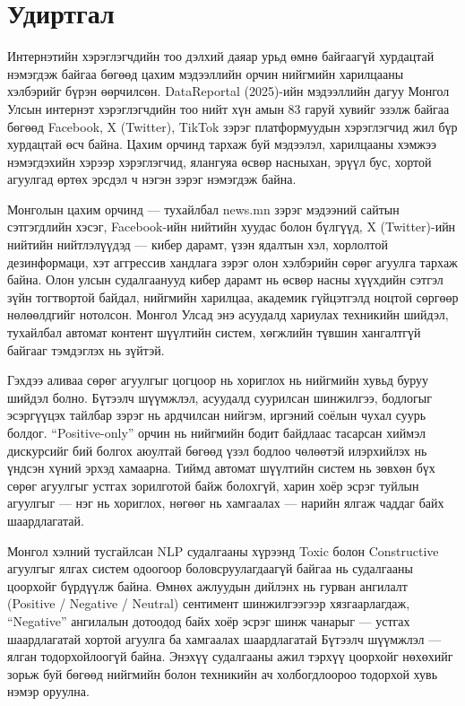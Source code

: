 
{}

\section*{Удиртгал}

Интернэтийн хэрэглэгчдийн тоо дэлхий даяар урьд өмнө байгаагүй хурдацтай
нэмэгдэж байгаа бөгөөд цахим мэдээллийн орчин нийгмийн харилцааны хэлбэрийг
бүрэн өөрчилсөн. DataReportal (2025)-ийн мэдээллийн дагуу Монгол Улсын
интернэт хэрэглэгчдийн тоо нийт хүн амын 83 гаруй хувийг эзэлж байгаа бөгөөд
Facebook, X (Twitter), TikTok зэрэг платформуудын хэрэглэгчид жил бүр хурдацтай
өсч байна. Цахим орчинд тархаж буй мэдээлэл, харилцааны хэмжээ нэмэгдэхийн
хэрээр хэрэглэгчид, ялангуяа өсвөр насныхан, эрүүл бус, хортой агуулгад
өртөх эрсдэл ч нэгэн зэрэг нэмэгдэж байна.

Монголын цахим орчинд --- тухайлбал news.mn зэрэг мэдээний сайтын сэтгэгдлийн
хэсэг, Facebook-ийн нийтийн хуудас болон бүлгүүд, X (Twitter)-ийн нийтийн
нийтлэлүүдэд --- кибер дарамт, үзэн ядалтын хэл, хорлолтой дезинформаци, хэт
аггрессив хандлага зэрэг олон хэлбэрийн сөрөг агуулга тархаж байна. Олон
улсын судалгаанууд \cite{kowalski2014,vogels2022} кибер дарамт нь өсвөр насны
хүүхдийн сэтгэл зүйн тогтвортой байдал, нийгмийн харилцаа, академик
гүйцэтгэлд ноцтой сөргөөр нөлөөлдгийг нотолсон. Монгол Улсад энэ асуудалд
хариулах техникийн шийдэл, тухайлбал автомат контент шүүлтийн систем,
хөгжлийн түвшин хангалтгүй байгааг тэмдэглэх нь зүйтэй.

Гэхдээ аливаа сөрөг агуулгыг цогцоор нь хориглох нь нийгмийн хувьд буруу
шийдэл болно. Бүтээлч шүүмжлэл, асуудалд суурилсан шинжилгээ, бодлогыг
эсэргүүцэх тайлбар зэрэг нь ардчилсан нийгэм, иргэний соёлын чухал суурь
болдог. ``Positive-only'' орчин нь нийгмийн бодит байдлаас тасарсан хиймэл
дискурсийг бий болгох аюултай бөгөөд үзэл бодлоо чөлөөтэй илэрхийлэх нь
үндсэн хүний эрхэд хамаарна. Тиймд автомат шүүлтийн систем нь зөвхөн бүх
сөрөг агуулгыг устгах зорилготой байж болохгүй, харин хоёр эсрэг туйлын
агуулгыг --- нэг нь хориглох, нөгөөг нь хамгаалах --- нарийн ялгаж чаддаг
байх шаардлагатай.

Монгол хэлний тусгайлсан NLP судалгааны хүрээнд Toxic болон Constructive
агуулгыг ялгах систем одоогоор боловсруулагдаагүй байгаа нь судалгааны
цоорхойг бүрдүүлж байна. Өмнөх ажлуудын дийлэнх нь гурван ангилалт
(Positive / Negative / Neutral) сентимент шинжилгээгээр хязгаарлагдаж,
``Negative'' ангилалын дотоодод байх хоёр эсрэг шинж чанарыг --- устгах
шаардлагатай хортой агуулга ба хамгаалах шаардлагатай Бүтээлч шүүмжлэл ---
ялган тодорхойлоогүй байна. Энэхүү судалгааны ажил тэрхүү цоорхойг нөхөхийг
зорьж буй бөгөөд нийгмийн болон техникийн ач холбогдлоороо тодорхой хувь
нэмэр оруулна.

